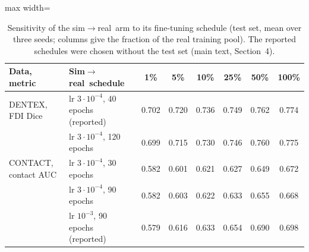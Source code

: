 \documentclass[12pt]{article}
\newcommand{\sr}{sim$\to$real}
\newcommand{\Sr}{Sim$\to$real}
\begin{document}
\begin{table}[h]
\centering\small
\caption{Sensitivity of the \sr\ arm to its fine-tuning schedule (test set, mean over three seeds; columns give the
fraction of the real training pool). The reported schedules were chosen without the test set
(main text, Section~4).}
\label{tab:sched}
\setlength{\tabcolsep}{4pt}
\begin{adjustbox}{max width=\linewidth}
\begin{tabular}{@{}llcccccc@{}}
\toprule
Data, metric & \Sr\ schedule & 1\% & 5\% & 10\% & 25\% & 50\% & 100\% \\
\midrule
DENTEX, FDI Dice & lr $3\cdot10^{-4}$, 40 epochs (reported) & 0.702 & 0.720 & 0.736 & 0.749 & 0.762 & 0.774 \\
 & lr $3\cdot10^{-4}$, 120 epochs & 0.699 & 0.715 & 0.730 & 0.746 & 0.760 & 0.775 \\
\midrule
CONTACT, contact AUC & lr $3\cdot10^{-4}$, 30 epochs & 0.582 & 0.601 & 0.621 & 0.627 & 0.649 & 0.672 \\
 & lr $3\cdot10^{-4}$, 90 epochs & 0.582 & 0.603 & 0.622 & 0.633 & 0.655 & 0.668 \\
 & lr $10^{-3}$, 90 epochs (reported) & 0.579 & 0.616 & 0.633 & 0.654 & 0.690 & 0.698 \\
\bottomrule
\end{tabular}
\end{adjustbox}
\end{table}
\end{document}
